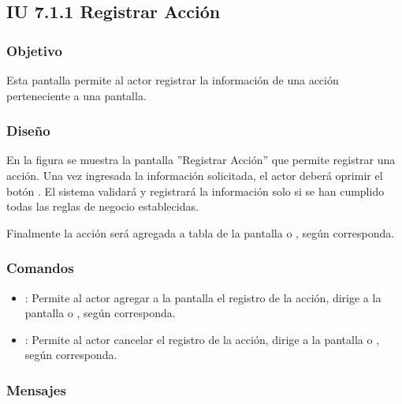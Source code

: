 \subsection{IU 7.1.1 Registrar Acción}

\subsubsection{Objetivo}
	Esta pantalla permite al actor registrar la información de una acción perteneciente a una pantalla.
\subsubsection{Diseño}
	En la figura  se muestra la pantalla ''Registrar Acción'' que permite registrar una acción.
	Una vez ingresada la información solicitada, el actor deberá oprimir el botón  . El sistema validará y registrará la información solo si se han cumplido todas las reglas de negocio establecidas.
	
	Finalmente la acción será agregada a tabla de la pantalla  o , según corresponda.

\subsubsection{Comandos}
\begin{itemize}
	\item {}: Permite al actor agregar a la pantalla el registro de la acción, dirige a la pantalla  o , según corresponda.
	\item {}: Permite al actor cancelar el registro de la acción, dirige a la pantalla  o , según corresponda.
\end{itemize}

\subsubsection{Mensajes}

